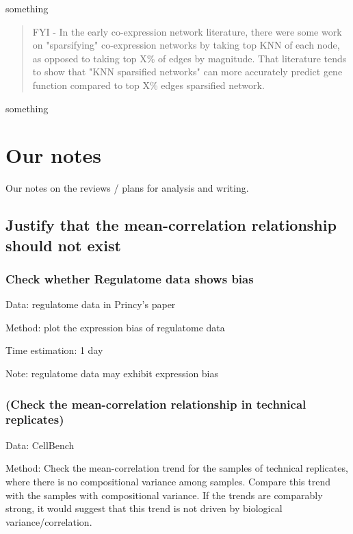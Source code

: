 \documentclass[english,letterpaper,pdftex,12pt]{article}
\begin{document}
\begin{response}
  something
\end{response}

\begin{quote}
FYI - In the early co-expression network literature, there were some work on "sparsifying" co-expression networks by taking top KNN of each node, as opposed to taking top X\% of edges by magnitude. That literature tends to show that "KNN sparsified networks" can more accurately predict gene function compared to top X\% edges sparsified network.
\end{quote}

\begin{response}
  something
\end{response}

\section*{Our notes}

Our notes on the reviews / plans for analysis and writing.

\subsection*{Justify that the mean-correlation relationship should not exist}
\subsubsection*{Check whether Regulatome data  shows bias}

Data: regulatome data  in Princy's paper

Method: plot the expression bias of regulatome data

Time estimation: 1 day

Note: regulatome data may exhibit expression bias

\subsubsection*{(Check the mean-correlation relationship in technical replicates) }

Data: CellBench

Method: Check the mean-correlation trend for the samples of technical replicates, where there is no compositional variance among samples. Compare this trend with the samples with compositional variance. If the trends are comparably strong, it would suggest that this trend is not driven by biological variance/correlation.
\end{document}
